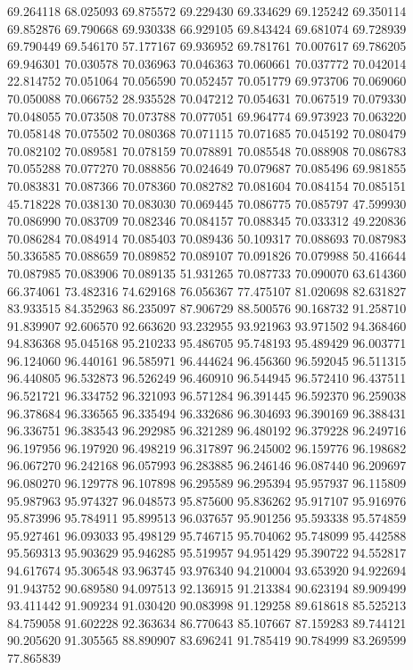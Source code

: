69.264118
68.025093
69.875572
69.229430
69.334629
69.125242
69.350114
69.852876
69.790668
69.930338
66.929105
69.843424
69.681074
69.728939
69.790449
69.546170
57.177167
69.936952
69.781761
70.007617
69.786205
69.946301
70.030578
70.036963
70.046363
70.060661
70.037772
70.042014
22.814752
70.051064
70.056590
70.052457
70.051779
69.973706
70.069060
70.050088
70.066752
28.935528
70.047212
70.054631
70.067519
70.079330
70.048055
70.073508
70.073788
70.077051
69.964774
69.973923
70.063220
70.058148
70.075502
70.080368
70.071115
70.071685
70.045192
70.080479
70.082102
70.089581
70.078159
70.078891
70.085548
70.088908
70.086783
70.055288
70.077270
70.088856
70.024649
70.079687
70.085496
69.981855
70.083831
70.087366
70.078360
70.082782
70.081604
70.084154
70.085151
45.718228
70.038130
70.083030
70.069445
70.086775
70.085797
47.599930
70.086990
70.083709
70.082346
70.084157
70.088345
70.033312
49.220836
70.086284
70.084914
70.085403
70.089436
50.109317
70.088693
70.087983
50.336585
70.088659
70.089852
70.089107
70.091826
70.079988
50.416644
70.087985
70.083906
70.089135
51.931265
70.087733
70.090070
63.614360
66.374061
73.482316
74.629168
76.056367
77.475107
81.020698
82.631827
83.933515
84.352963
86.235097
87.906729
88.500576
90.168732
91.258710
91.839907
92.606570
92.663620
93.232955
93.921963
93.971502
94.368460
94.836368
95.045168
95.210233
95.486705
95.748193
95.489429
96.003771
96.124060
96.440161
96.585971
96.444624
96.456360
96.592045
96.511315
96.440805
96.532873
96.526249
96.460910
96.544945
96.572410
96.437511
96.521721
96.334752
96.321093
96.571284
96.391445
96.592370
96.259038
96.378684
96.336565
96.335494
96.332686
96.304693
96.390169
96.388431
96.336751
96.383543
96.292985
96.321289
96.480192
96.379228
96.249716
96.197956
96.197920
96.498219
96.317897
96.245002
96.159776
96.198682
96.067270
96.242168
96.057993
96.283885
96.246146
96.087440
96.209697
96.080270
96.129778
96.107898
96.295589
96.295394
95.957937
96.115809
95.987963
95.974327
96.048573
95.875600
95.836262
95.917107
95.916976
95.873996
95.784911
95.899513
96.037657
95.901256
95.593338
95.574859
95.927461
96.093033
95.498129
95.746715
95.704062
95.748099
95.442588
95.569313
95.903629
95.946285
95.519957
94.951429
95.390722
94.552817
94.617674
95.306548
93.963745
93.976340
94.210004
93.653920
94.922694
91.943752
90.689580
94.097513
92.136915
91.213384
90.623194
89.909499
93.411442
91.909234
91.030420
90.083998
91.129258
89.618618
85.525213
84.759058
91.602228
92.363634
86.770643
85.107667
87.159283
89.744121
90.205620
91.305565
88.890907
83.696241
91.785419
90.784999
83.269599
77.865839

